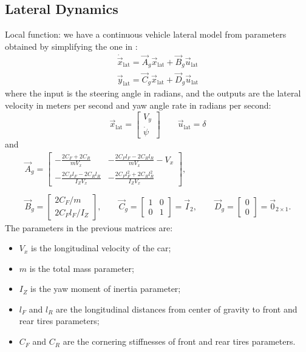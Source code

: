 \subsection{Lateral Dynamics}
Local function: we have a continuous vehicle lateral model from parameters obtained by simplifying the one in \cite{rathai}: 
\begin{equation}
\label{eqn:lateral_dynamics_simple_model}
\begin{array}{ll}
\dot{\vec{x}}_{\text{lat}} =\vec{A}_g \vec{x}_{\text{lat}}+ \vec{B}_g \vec{u}_{\text{lat}}\\
\vec{y}_{\text{lat}} =\vec{C}_g \vec{x}_{\text{lat}} + \vec{D}_g \vec{u}_{\text{lat}}
\end{array}
\end{equation}
where the input is the steering angle in radians, and the outputs are the lateral velocity in meters per second and yaw angle rate in radians per second:
\begin{equation}
\vec{x}_{\text{lat}} = \begin{bmatrix}
V_y\\\dot{\psi}
\end{bmatrix}
\qquad
\vec{u}_{\text{lat}} = \delta
\end{equation}
and
\begin{equation}
\begin{array}{cc}
\vec{A}_g=
\begin{bmatrix}
\displaystyle -\frac{2C_F+2C_R}{mV_x}&\displaystyle -\frac{2C_Fl_F-2C_Rl_R}{mV_x} - V_x\\
\displaystyle -\frac{2C_Fl_F-2C_Rl_R}{I_ZV_x}&\displaystyle -\frac{2C_Fl_F^2+2C_Rl_R^2}{I_ZV_x}
\end{bmatrix},
\\\\
\vec{B}_g=\begin{bmatrix}
2C_F/m\\2C_Fl_F/I_Z
\end{bmatrix},
\qquad
\vec{C}_g=\begin{bmatrix}
1&0\\0&1
\end{bmatrix}=
\vec{I}_2, 
\qquad
\vec{D}_g=\begin{bmatrix}
0\\0
\end{bmatrix}=
\vec{0}_{2\times1}.
\end{array}
\end{equation}
The parameters in the previous matrices are:
\begin{itemize}
	\item $V_x$ is the longitudinal velocity of the car;	
	\item $m$ is the total mass parameter; 
	\item $I_Z$ is the yaw moment of inertia parameter;
	\item $l_F$ and $l_R$ are the longitudinal distances from center of gravity to front and rear tires parameters;
	\item $C_F$ and $C_R$ are the cornering stiffnesses of front and rear tires parameters.
\end{itemize}
